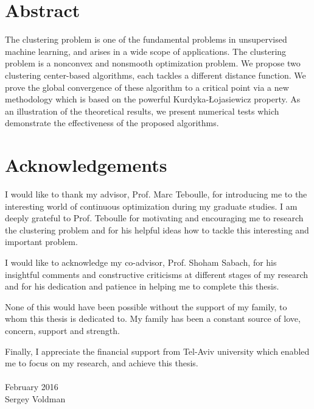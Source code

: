 \setcounter{page}{3}
\chapter*{Abstract}

The clustering problem is one of the fundamental problems in unsupervised machine learning, and arises in a wide scope of applications. The clustering problem is a nonconvex and nonsmooth optimization problem. We propose two clustering center-based algorithms, each tackles a different distance function. We prove the global convergence of these algorithm to a critical point via a new methodology which is based on the powerful Kurdyka-{\L}ojasiewicz property. As an illustration of the theoretical results, we present numerical tests which demonstrate the effectiveness of the proposed algorithms.



\chapter*{Acknowledgements}

I would like to thank my advisor, Prof. Marc Teboulle, for introducing me to the interesting world of continuous optimization during my graduate studies. I am deeply grateful to Prof. Teboulle for motivating and encouraging me to research the clustering problem and for his helpful ideas how to tackle this interesting and important problem.

I would like to acknowledge my co-advisor, Prof. Shoham Sabach, for his insightful comments and constructive criticisms at different stages of my research and for his dedication and patience in helping me to complete this thesis.

None of this would have been possible without the support of my family, to whom this thesis is dedicated to. My family has been a constant source of love, concern, support and strength.

Finally, I appreciate the financial support from Tel-Aviv university which enabled me to focus on my research, and achieve this thesis.
\\
\\
\noindent February 2016\\
\noindent Sergey Voldman



\nobreak
